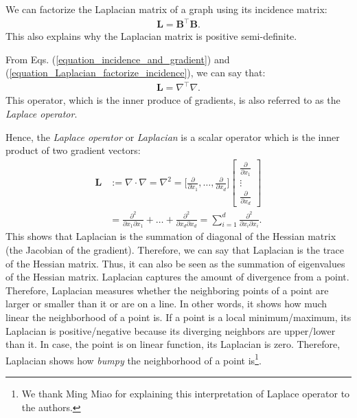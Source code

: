 \documentclass[lang=cn,10pt]{gorgeousnbook}
\numberwithin{equation}{section}%
\numberwithin{figure}{section}%
\begin{document}
\begin{lemma}
We can factorize the Laplacian matrix of a graph using its incidence matrix:
\begin{align}\label{equation_Laplacian_factorize_incidence}
\boldsymbol{L} = \boldsymbol{B}^\top \boldsymbol{B}.
\end{align}
This also explains why the Laplacian matrix is positive semi-definite. 
\end{lemma}

\begin{corollary}
From Eqs. (\ref{equation_incidence_and_gradient}) and (\ref{equation_Laplacian_factorize_incidence}), we can say that:
\begin{align}\label{equation_Laplacian_factorize_gradient}
\boldsymbol{L} = \nabla^\top \nabla.
\end{align}
This operator, which is the inner produce of gradients, is also referred to as the \textit{Laplace operator}.
\end{corollary}

Hence, the \textit{Laplace operator} or \textit{Laplacian} is a scalar operator which is the inner product of two gradient vectors:
\begin{equation}
\begin{aligned}
\boldsymbol{L} &:= \nabla \cdot \nabla = \nabla^2 = \Big[\frac{\partial}{\partial x_1}, \dots, \frac{\partial}{\partial x_d}\Big]
\begin{bmatrix}
    \frac{\partial}{\partial x_1} \\
    \vdots \\
    \frac{\partial}{\partial x_d} 
\end{bmatrix} \\
&= \frac{\partial^2}{\partial x_1 \partial x_1} + \dots + \frac{\partial^2}{\partial x_d \partial x_d} = \sum_{i=1}^d \frac{\partial^2}{\partial x_i \partial x_i}.
\end{aligned}
\end{equation}
This shows that Laplacian is the summation of diagonal of the Hessian matrix (the Jacobian of the gradient). Therefore, we can say that Laplacian is the trace of the Hessian matrix. Thus, it can also be seen as the summation of eigenvalues of the Hessian matrix.
Laplacian captures the amount of divergence from a point.
Therefore, Laplacian measures whether the neighboring points of a point are larger or smaller than it or are on a line. In other words, it shows how much linear the neighborhood of a point is. If a point is a local minimum/maximum, its Laplacian is positive/negative because its diverging neighbors are upper/lower than it. In case, the point is on linear function, its Laplacian is zero.
Therefore, Laplacian shows how \textit{bumpy} the neighborhood of a point is\footnote{We thank Ming Miao for explaining this interpretation of Laplace operator to the authors.}.
\end{document}
